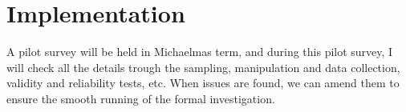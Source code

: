 \documentclass[12pt]{article} %
\begin{document}
\section*{Implementation}

\noindent A pilot survey will be held in Michaelmas term, and during this pilot survey, I will check all the details trough the sampling, manipulation and data collection, validity and reliability tests, etc. When issues are found, we can amend them to ensure the smooth running of the formal investigation.\\

\newpage


\end{document}
